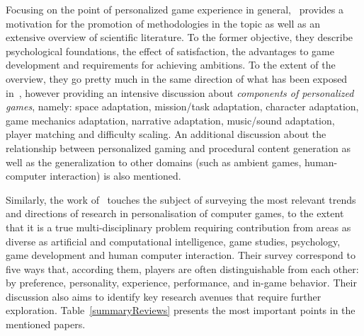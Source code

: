 Focusing on the point of personalized game experience in general,~\cite{bakkes_personalised_2012} provides a motivation for the promotion of methodologies in the topic as well as an extensive overview of scientific literature. To the former objective, they describe psychological foundations, the effect of satisfaction, the advantages to game development and requirements for achieving ambitions. To the extent of the overview, they go pretty much in the same direction of what has been exposed in~\cite{bakkes_player_2012}, however providing an intensive discussion about \textit{components of personalized games}, namely: space adaptation, mission/task adaptation, character adaptation, game mechanics adaptation, narrative adaptation, music/sound adaptation, player matching and difficulty scaling. An additional discussion about the relationship between personalized gaming and procedural content generation as well as the generalization to other domains (such as ambient games, human-computer interaction) is also mentioned.

Similarly, the work of~\cite{karpinskyj_video_2014} touches the subject of surveying the most relevant trends and directions of research in personalisation of computer games, to the extent that it is a true multi-disciplinary problem requiring contribution from areas as diverse as artificial and computational intelligence, game studies, psychology, game development and human computer interaction. Their survey correspond to five ways that, according them, players are often distinguishable from each other: by preference, personality, experience, performance, and in-game behavior. Their discussion also aims to identify key research avenues that require further exploration. Table~\ref{summaryReviews} presents the most important points in the mentioned papers. 

